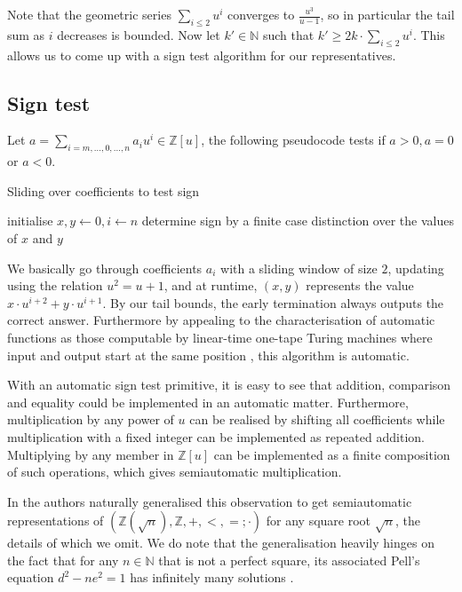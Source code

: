 \documentclass[british,a4paper,11pt,abstract=on]{scrreprt}
\theoremstyle{definition}
\theoremstyle{remark}
\newcommand{\N}{\mathbb{N}}
\newcommand{\Z}{\mathbb{Z}}
\begin{document}
Note that the geometric series \(\sum_{i\leq 2} u^i\) converges to \(\frac{u^3}{u-1}\),
so in particular the tail sum as \(i\) decreases is bounded.
Now let \(k' \in \N\) such that \(k' \geq 2k\cdot\sum_{i\leq 2}u^i\).
This allows us to come up with a sign test algorithm for our representatives.

\subsection{Sign test}

Let \(a = \sum_{i=m,\dots,0,\dots,n} a_i u^i \in \Z[u]\), the following pseudocode tests if \(a>0, a=0\) or \(a<0\).
\begin{algorithm}
    \caption{Sliding over coefficients to test sign}
    \DontPrintSemicolon
    initialise \(x, y \leftarrow 0, i\leftarrow n\)\;
    determine sign by a finite case distinction over the values of \(x\) and \(y\)
\end{algorithm}

We basically go through coefficients \(a_i\) with a sliding window of size \(2\), updating using the relation \(u^2 = u + 1\),
and at runtime, \((x,y)\) represents the value \(x\cdot u^{i+2} + y\cdot u^{i+1}\).
By our tail bounds, the early termination always outputs the correct answer.
Furthermore by appealing to the characterisation of automatic functions as those computable by linear-time one-tape Turing machines
where input and output start at the same position \autocite{Case2012}, this algorithm is automatic.

With an automatic sign test primitive, it is easy to see that addition, comparison and equality could be implemented in an automatic matter.
Furthermore, multiplication by any power of \(u\) can be realised by shifting all coefficients while multiplication with a fixed integer can be implemented as repeated addition.
Multiplying by any member in \(\Z[u]\) can be implemented as a finite composition of such operations, which gives semiautomatic multiplication.

In \autocite{semiauto} the authors naturally generalised this observation to get semiautomatic representations of
\((\Z(\sqrt{n}), \Z, +, <, =;\cdot)\) for any square root \(\sqrt{n}\), the details of which we omit.
We do note that the generalisation heavily hinges on the fact that for any \(n\in\N\) that is not a perfect square,
its associated Pell's equation \(d^2 - ne^2 = 1\) has infinitely many solutions \autocite{lagrange}.
\end{document}
